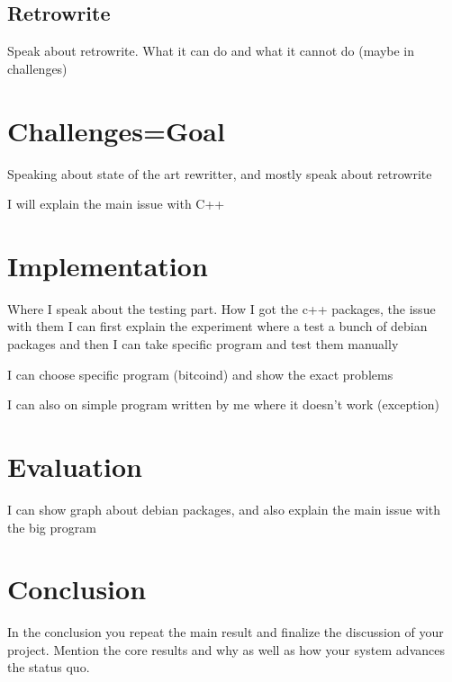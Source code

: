 \documentclass[a4paper,11pt,oneside]{report}
\begin{document}
\section{Retrowrite}
Speak about retrowrite. What it can do and what it cannot do (maybe in challenges)



\chapter{Challenges=Goal}
Speaking about state of the art rewritter, and mostly
speak about retrowrite

I will explain the main issue with C++

\chapter{Implementation}
Where I speak about the testing part. How I got the c++ packages, the issue with them
I can first explain the experiment where a test a bunch of debian packages and
then I can take specific program and test them manually

I can choose specific program (bitcoind) and show the exact problems

I can also on simple program written by me where it
doesn't work (exception)



\chapter{Evaluation}
I can show graph about debian packages, and also explain the main issue with the big program



%



\chapter{Conclusion}

In the conclusion you repeat the main result and finalize the discussion of
your project. Mention the core results and why as well as how your system
advances the status quo.
\end{document}
